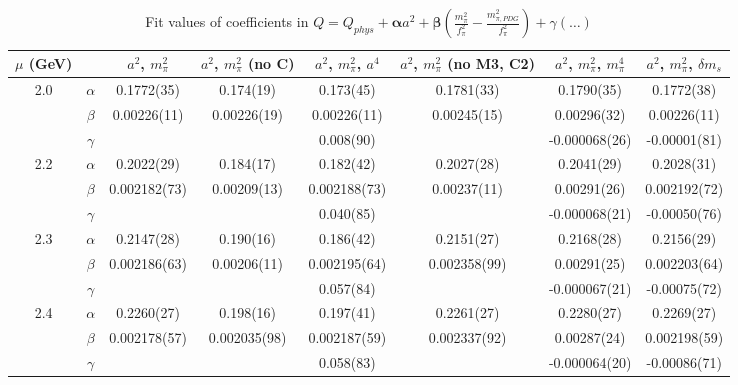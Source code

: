 \documentclass[12pt]{extarticle}
\begin{document}
\begin{table}[h!]
\begin{center}
\begin{tabular}{|c c|c|c|c|c|c|c|}
\hline
$\mu$ (GeV) &  & $a^2$, $m_\pi^2$& $a^2$, $m_\pi^2$ (no C)& $a^2$, $m_\pi^2$, $a^4$& $a^2$, $m_\pi^2$ (no M3, C2)& $a^2$, $m_\pi^2$, $m_\pi^4$& $a^2$, $m_\pi^2$, $\delta m_s$\\
\hline
\multirow{3}{0.5in}{2.0} & $\alpha$ & 0.1772(35)& 0.174(19)& 0.173(45)& 0.1781(33)& 0.1790(35)& 0.1772(38)\\
 & $\beta$ & 0.00226(11)& 0.00226(19)& 0.00226(11)& 0.00245(15)& 0.00296(32)& 0.00226(11)\\
 & $\gamma$ &  &  & 0.008(90)&  & -0.000068(26)& -0.00001(81)\\
\hline
\multirow{3}{0.5in}{2.2} & $\alpha$ & 0.2022(29)& 0.184(17)& 0.182(42)& 0.2027(28)& 0.2041(29)& 0.2028(31)\\
 & $\beta$ & 0.002182(73)& 0.00209(13)& 0.002188(73)& 0.00237(11)& 0.00291(26)& 0.002192(72)\\
 & $\gamma$ &  &  & 0.040(85)&  & -0.000068(21)& -0.00050(76)\\
\hline
\multirow{3}{0.5in}{2.3} & $\alpha$ & 0.2147(28)& 0.190(16)& 0.186(42)& 0.2151(27)& 0.2168(28)& 0.2156(29)\\
 & $\beta$ & 0.002186(63)& 0.00206(11)& 0.002195(64)& 0.002358(99)& 0.00291(25)& 0.002203(64)\\
 & $\gamma$ &  &  & 0.057(84)&  & -0.000067(21)& -0.00075(72)\\
\hline
\multirow{3}{0.5in}{2.4} & $\alpha$ & 0.2260(27)& 0.198(16)& 0.197(41)& 0.2261(27)& 0.2280(27)& 0.2269(27)\\
 & $\beta$ & 0.002178(57)& 0.002035(98)& 0.002187(59)& 0.002337(92)& 0.00287(24)& 0.002198(59)\\
 & $\gamma$ &  &  & 0.058(83)&  & -0.000064(20)& -0.00086(71)\\
\hline
\end{tabular}
\caption{Fit values of coefficients in $Q = Q_{phys} + \mathbf{\alpha} a^2 + \mathbf{\beta}\left(\frac{m_\pi^2}{f_\pi^2}-\frac{m_{\pi,PDG}^2}{f_\pi^2}\right) + \gamma(\ldots)$}
\end{center}
\end{table}





\end{document}
